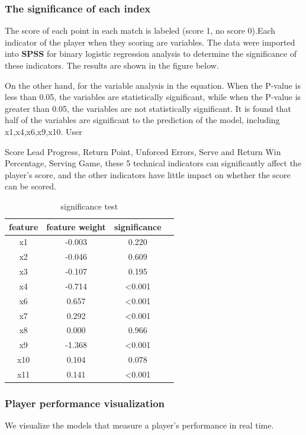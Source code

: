 \documentclass{mcmthesis}  %
\begin{document}
\subsubsection{The significance of each index}
\hspace{1.5em} The score of each point in each match is labeled (score 1, no score 0).Each indicator of the player when they scoring are variables. The data were imported into \textbf{SPSS} for binary logistic regression analysis to determine the significance of these indicators. The results are shown in the figure below.

\par On the other hand, for the variable analysis in the equation. When the P-value is less than 0.05, the variables are statistically significant, while when the P-value is greater than 0.05, the variables are not statistically significant. It is found that half of the variables are significant to the prediction of the model, including x1,x4,x6,x9,x10.
User
\par Score Lead Progress, Return Point, Unforced Errors, Serve and Return Win Percentage, Serving Game, these 5 technical indicators can significantly affect the player's score, and the other indicators have little impact on whether the score can be scored.
\begin{table}[!htb]  %
\centering
\caption{significance test}  %
\label{tab2}  %
\tabcolsep 50pt %
\begin{tabular*}{\textwidth}{cccc}  %
\toprule  %
feature & feature weight & significance \\
\midrule  %
x1 & -0.003 & 0.220  \\
x2 & -0.046 & 0.609  \\
x3 & -0.107 & 0.195  \\
x4 & -0.714 & <0.001  \\
x6 & 0.657 & <0.001  \\
x7 & 0.292 & <0.001  \\
x8 & 0.000 & 0.966  \\
x9 & -1.368 & <0.001  \\
x10 & 0.104 & 0.078  \\
x11 & 0.141 & <0.001  \\
\bottomrule  %
\end{tabular*}  %
\end{table}  %

\subsubsection{Player performance visualization}
\par We visualize the models that measure a player's performance in real time.
\newpage
\end{document}

